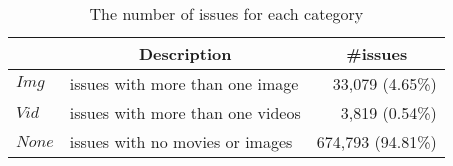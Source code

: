 
\begin{table}[t]
    \begin{center}
    \caption{The number of issues for each category}
    \begin{tabular}{llr}
        \toprule
         & \multicolumn{1}{c}{\textbf{Description}} & \multicolumn{1}{c}{\textbf{\#issues}} \\
        \midrule
        $Img$  & issues with more than one image & 33,079 (4.65\%)\\%
        $Vid$  & issues with more than one videos & 3,819 (0.54\%)\\%
        $None$ & issues with no movies or images & 674,793 (94.81\%)\\ 
        \bottomrule
    \end{tabular}
    \label{tab:issue-category}
    \end{center}
\end{table}
